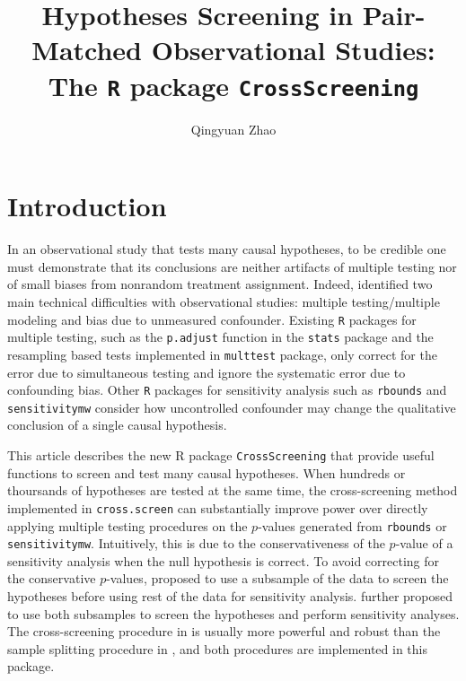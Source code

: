 \documentclass[11pt]{article}\usepackage[]{graphicx}\usepackage[]{color}
\begin{document}
\title{Hypotheses Screening in Pair-Matched Observational Studies: The \texttt{R} package \texttt{CrossScreening}}

\author{Qingyuan Zhao}

\maketitle

\section{Introduction}

In an observational study that tests many causal hypotheses, to be credible one must demonstrate that its conclusions are neither artifacts of multiple testing nor of small biases from nonrandom treatment assignment. Indeed, \citet{young2011deming} identified two main technical difficulties with observational studies: multiple testing/multiple modeling and bias due to unmeasured confounder. Existing \texttt{R} packages for multiple testing, such as the \texttt{p.adjust} function in the \texttt{stats} package \citep{r2017} and the resampling based tests implemented in \texttt{multtest} package, only correct for the error due to simultaneous testing and ignore the systematic error due to confounding bias. Other \texttt{R} packages for sensitivity analysis such as \texttt{rbounds} \citep{keele2014rbounds} and \texttt{sensitivitymw} \citep{rosenbaum2015two} consider how uncontrolled confounder may change the qualitative conclusion of a single causal hypothesis.

This article describes the new R package \texttt{CrossScreening} that provide useful functions to screen and test many causal hypotheses. When hundreds or thoursands of hypotheses are tested at the same time, the cross-screening method implemented in \texttt{cross.screen} can substantially improve power over directly applying multiple testing procedures on the $p$-values generated from \texttt{rbounds} or \texttt{sensitivitymw}. Intuitively, this is due to the conservativeness of the $p$-value of a sensitivity analysis when the null hypothesis is correct. To avoid correcting for the conservative $p$-values, \citet{heller2009split} proposed to use a subsample of the data to screen the hypotheses before using rest of the data for sensitivity analysis. \citet{zhao2017cross} further proposed to use both subsamples to screen the hypotheses and perform sensitivity analyses. The cross-screening procedure in \citet{zhao2017cross} is usually more powerful and robust than the sample splitting procedure in \citet{heller2009split}, and both procedures are implemented in this package.
\end{document}
